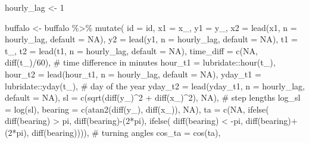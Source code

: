 \documentclass[
  letterpaper,
  DIV=11,
  numbers=noendperiod]{scrartcl}
\newenvironment{Shaded}{\begin{snugshade}}{\end{snugshade}}
\newcommand{\AttributeTok}[1]{\textcolor[rgb]{0.40,0.45,0.13}{#1}}
\newcommand{\CommentTok}[1]{\textcolor[rgb]{0.37,0.37,0.37}{#1}}
\newcommand{\ConstantTok}[1]{\textcolor[rgb]{0.56,0.35,0.01}{#1}}
\newcommand{\DecValTok}[1]{\textcolor[rgb]{0.68,0.00,0.00}{#1}}
\newcommand{\FunctionTok}[1]{\textcolor[rgb]{0.28,0.35,0.67}{#1}}
\newcommand{\NormalTok}[1]{\textcolor[rgb]{0.00,0.23,0.31}{#1}}
\newcommand{\OtherTok}[1]{\textcolor[rgb]{0.00,0.23,0.31}{#1}}
\newcommand{\SpecialCharTok}[1]{\textcolor[rgb]{0.37,0.37,0.37}{#1}}
\begin{document}
\begin{Shaded}
\begin{Highlighting}[]
\NormalTok{hourly\_lag }\OtherTok{\textless{}{-}} \DecValTok{1}

\NormalTok{buffalo }\OtherTok{\textless{}{-}}\NormalTok{ buffalo }\SpecialCharTok{\%\textgreater{}\%} \FunctionTok{mutate}\NormalTok{(}
  \AttributeTok{id =}\NormalTok{ id,}
  \AttributeTok{x1 =}\NormalTok{ x\_,}
  \AttributeTok{y1 =}\NormalTok{ y\_,}
  \AttributeTok{x2 =} \FunctionTok{lead}\NormalTok{(x1, }\AttributeTok{n =}\NormalTok{ hourly\_lag, }\AttributeTok{default =} \ConstantTok{NA}\NormalTok{),}
  \AttributeTok{y2 =} \FunctionTok{lead}\NormalTok{(y1, }\AttributeTok{n =}\NormalTok{ hourly\_lag, }\AttributeTok{default =} \ConstantTok{NA}\NormalTok{),}
  \AttributeTok{t1 =}\NormalTok{ t\_,}
  \AttributeTok{t2 =} \FunctionTok{lead}\NormalTok{(t1, }\AttributeTok{n =}\NormalTok{ hourly\_lag, }\AttributeTok{default =} \ConstantTok{NA}\NormalTok{),}
  \AttributeTok{time\_diff =} \FunctionTok{c}\NormalTok{(}\ConstantTok{NA}\NormalTok{, }\FunctionTok{diff}\NormalTok{(t\_)}\SpecialCharTok{/}\DecValTok{60}\NormalTok{), }\CommentTok{\# time difference in minutes}
  \AttributeTok{hour\_t1 =}\NormalTok{ lubridate}\SpecialCharTok{::}\FunctionTok{hour}\NormalTok{(t\_),}
  \AttributeTok{hour\_t2 =} \FunctionTok{lead}\NormalTok{(hour\_t1, }\AttributeTok{n =}\NormalTok{ hourly\_lag, }\AttributeTok{default =} \ConstantTok{NA}\NormalTok{),}
  \AttributeTok{yday\_t1 =}\NormalTok{ lubridate}\SpecialCharTok{::}\FunctionTok{yday}\NormalTok{(t\_), }\CommentTok{\# day of the year}
  \AttributeTok{yday\_t2 =} \FunctionTok{lead}\NormalTok{(yday\_t1, }\AttributeTok{n =}\NormalTok{ hourly\_lag, }\AttributeTok{default =} \ConstantTok{NA}\NormalTok{),}
  \AttributeTok{sl =} \FunctionTok{c}\NormalTok{(}\FunctionTok{sqrt}\NormalTok{(}\FunctionTok{diff}\NormalTok{(y\_)}\SpecialCharTok{\^{}}\DecValTok{2} \SpecialCharTok{+} \FunctionTok{diff}\NormalTok{(x\_)}\SpecialCharTok{\^{}}\DecValTok{2}\NormalTok{), }\ConstantTok{NA}\NormalTok{), }\CommentTok{\# step lengths}
  \AttributeTok{log\_sl =} \FunctionTok{log}\NormalTok{(sl),}
  \AttributeTok{bearing =} \FunctionTok{c}\NormalTok{(}\FunctionTok{atan2}\NormalTok{(}\FunctionTok{diff}\NormalTok{(y\_), }\FunctionTok{diff}\NormalTok{(x\_)), }\ConstantTok{NA}\NormalTok{),}
  \AttributeTok{ta =} \FunctionTok{c}\NormalTok{(}\ConstantTok{NA}\NormalTok{, }\FunctionTok{ifelse}\NormalTok{(}
    \FunctionTok{diff}\NormalTok{(bearing) }\SpecialCharTok{\textgreater{}}\NormalTok{ pi, }\FunctionTok{diff}\NormalTok{(bearing)}\SpecialCharTok{{-}}\NormalTok{(}\DecValTok{2}\SpecialCharTok{*}\NormalTok{pi), }\FunctionTok{ifelse}\NormalTok{(}
      \FunctionTok{diff}\NormalTok{(bearing) }\SpecialCharTok{\textless{}} \SpecialCharTok{{-}}\NormalTok{pi, }\FunctionTok{diff}\NormalTok{(bearing)}\SpecialCharTok{+}\NormalTok{(}\DecValTok{2}\SpecialCharTok{*}\NormalTok{pi), }\FunctionTok{diff}\NormalTok{(bearing)))), }\CommentTok{\# turning angles}
  \AttributeTok{cos\_ta =} \FunctionTok{cos}\NormalTok{(ta),}
  

\end{Highlighting}
\end{Shaded}
\end{document}
